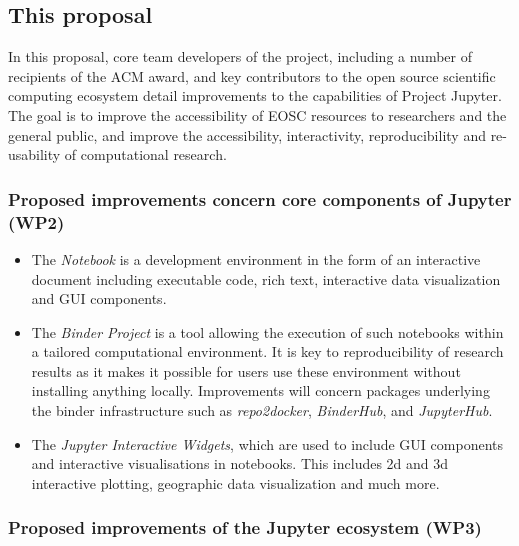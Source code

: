 \subsection{This proposal}

In this proposal, core team developers of the project, including a
number of recipients of the ACM award, and key contributors to the
open source scientific computing ecosystem detail improvements to the
capabilities of Project Jupyter.  The goal is to improve the
accessibility of EOSC resources to researchers and the general public,
and improve the accessibility, interactivity, reproducibility and
re-usability of computational research.

\subsubsection{Proposed improvements concern core components of Jupyter (WP2)}

\begin{itemize}
\item The \emph{Notebook} is a development environment in the form of an
interactive document including executable code, rich text, interactive data
visualization and GUI components.
\item The \emph{Binder Project} is a tool allowing the execution of such
notebooks within a tailored computational environment. It is key to reproducibility
of research results as it makes it possible for
users use these environment without installing anything locally.
Improvements will concern packages underlying the binder infrastructure such
as \emph{repo2docker}, \emph{BinderHub}, and \emph{JupyterHub}.
\item The \emph{Jupyter Interactive Widgets}, which are used to include GUI
components and interactive visualisations in notebooks. This includes 2d
and 3d interactive plotting, geographic data visualization and much more.
\end{itemize}

\subsubsection{Proposed improvements of the Jupyter ecosystem (WP3)}

